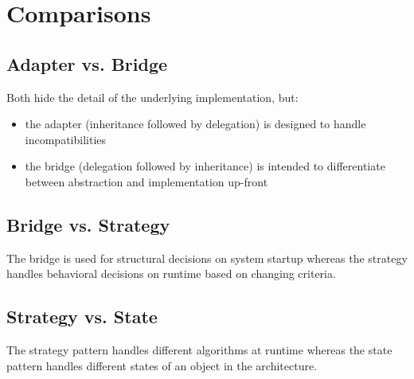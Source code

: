 
\section{Comparisons}

\subsection{Adapter vs. Bridge}
Both hide the detail of the underlying implementation, but:
\begin{itemize}
   \item the adapter (inheritance followed by delegation) is designed to handle incompatibilities
   \item the bridge (delegation followed by inheritance) is intended to differentiate between abstraction and implementation up-front
 \end{itemize}

 \subsection{Bridge vs. Strategy}
 The bridge is used for structural decisions on system startup whereas the strategy handles behavioral decisions on runtime based on changing criteria.

\subsection{Strategy vs. State}
The strategy pattern handles different algorithms at runtime whereas the state pattern handles different states of an object in the architecture.
